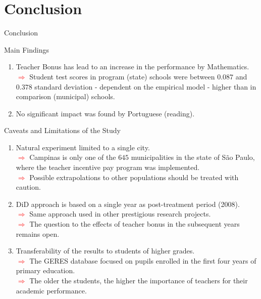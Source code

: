 \documentclass{beamer}
\begin{document}
\section{Conclusion}

\begin{frame}[label=Main5]{Conclusion}
\begin{block}{\centering \Large Main Findings}
\begin{enumerate}
\item \scriptsize Teacher Bonus has lead to an increase in the performance by Mathematics. \\ \tiny \textcolor{red}{$\Longrightarrow$} Student test scores in program (state) schools were between $0.087$ and $0.378$ standard deviation - dependent on the empirical model - higher than in comparison (municipal) schools.
\item \scriptsize No significant impact was found by Portuguese (reading).
\end{enumerate}
\end{block}

\vspace{0.3cm}
\begin{block}{\centering \Large Caveats and Limitations of the Study}
\vspace{-19pt} \flushright \hyperlink{Bibliography}{\beamerbutton{\textcolor{red}{Papers}}}
\begin{enumerate}
\item \scriptsize Natural experiment limited to a single city.
\\ \tiny \textcolor{red}{$\Longrightarrow$} Campinas is only one of the $645$ municipalities in the state of São Paulo, where the teacher incentive pay program was implemented.
\\ \tiny \textcolor{red}{$\Longrightarrow$} Possible extrapolations to other populations should be treated with caution.
\item \scriptsize DiD approach is based on a single year as post-treatment period (2008).
\\ \tiny \textcolor{red}{$\Longrightarrow$} Same approach used in other prestigious research projects. 
\\ \tiny \textcolor{red}{$\Longrightarrow$} The question to the effects of teacher bonus in the subsequent years remains open.
\item \scriptsize Transferability of the results to students of higher grades.
\\ \tiny \textcolor{red}{$\Longrightarrow$} The GERES database focused on pupils enrolled in the first four years of primary education.
\\ \tiny \textcolor{red}{$\Longrightarrow$} The older the students, the higher the importance of teachers for their academic performance.
\end{enumerate}
\end{block}  
\end{frame}
\end{document}
